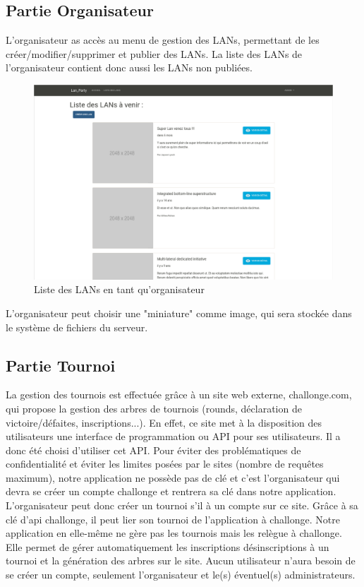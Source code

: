 \documentclass[12pt]{article}
\begin{document}
\subsection{Partie Organisateur}

L'organisateur as accès au menu de gestion des LANs, permettant de les créer/modifier/supprimer et publier des LANs. La liste des LANs de l'organisateur contient donc aussi les LANs non publiées.

\begin{figure}[H]
\centering
\includegraphics[scale=0.20]{images/liste_orga.png}
\caption{Liste des LANs en tant qu'organisateur}
\label{}
\end{figure}

L'organisateur peut choisir une "miniature" comme image, qui sera stockée dans le système de fichiers du serveur.

\subsection{Partie Tournoi}

La gestion des tournois est effectuée grâce à un site web externe, challonge.com, qui propose la gestion des arbres de tournois (rounds, déclaration de victoire/défaites, inscriptions...). En effet, ce site met à la disposition des utilisateurs une interface de programmation ou API pour ses utilisateurs.
Il a donc été choisi d'utiliser cet API. Pour éviter des problématiques de confidentialité et éviter les limites posées par le sites (nombre de requêtes maximum), notre application ne possède pas de clé et c'est l'organisateur qui devra se créer un compte challonge et rentrera sa clé dans notre application.
L'organisateur peut donc créer un tournoi s'il à un compte sur ce site. Grâce à sa clé d'api challonge, il peut lier son tournoi de l'application à challonge. Notre application en elle-même ne gère pas les tournois mais les relègue à challonge. Elle permet de gérer automatiquement les inscriptions désinscriptions à un tournoi et la génération des arbres sur le site. Aucun utilisateur n'aura besoin de se créer un compte, seulement l'organisateur et le(s) éventuel(s) administrateurs.
\end{document}
